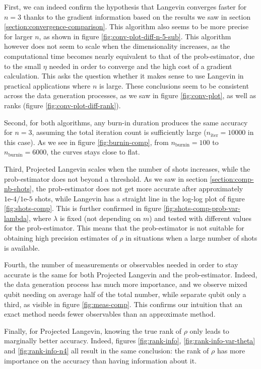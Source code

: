 \documentclass[12pt]{memoir}
\newcommand{\nitern}[1]{$n_{\text{iter}}=#1$}
\newcommand{\nburninn}[1]{$n_{\text{burnin}}=#1$}
\begin{document}
First, we can indeed confirm the hypothesis that Langevin converges faster for $n=3$ thanks to the gradient information based on the results we saw in section \ref{section:convergence-comparison}. This algorithm also seems to be more precise for larger $n$, as shown in figure \ref{fig:conv-plot-diff-n-5-sub}. This algorithm however does not seem to scale when the dimensionality increases, as the computational time becomes nearly equivalent to that of the prob-estimator, due to the small $\eta$ needed in order to converge and the high cost of a gradient calculation. This asks the question whether it makes sense to use Langevin in practical applications where $n$ is large. These conclusions seem to be consistent across the data generation processes, as we saw in figure \ref{fig:conv-plot}, as well as ranks (figure \ref{fig:conv-plot-diff-rank}).\medbreak

Second, for both algorithms, any burn-in duration produces the same accuracy for $n=3$, assuming the total iteration count is sufficiently large (\nitern{10000} in this case). As we see in figure \ref{fig:burnin-comp}, from \nburninn{100} to \nburninn{6000}, the curves stays close to flat.\medbreak

Third, Projected Langevin scales when the number of shots increases, while the prob-estimator does not beyond a threshold. As we saw in section \ref{section:comp-nb-shots}, the prob-estimator does not get more accurate after approximately $1\text{e-}4/1\text{e-}5$ shots, while Langevin has a straight line in the log-log plot of figure \ref{fig:shots-comp}. This is further confirmed in figure \ref{fig:shots-comp-prob-var-lambda}, where $\lambda$ is fixed (not depending on $m$) and tested with different values for the prob-estimator. This means that the prob-estimator is not suitable for obtaining high precision estimates of $\rho$ in situations when a large number of shots is available.\medbreak

Fourth, the number of measurements or observables needed in order to stay accurate is the same for both Projected Langevin and the prob-estimator. Indeed, the data generation process has much more importance, and we observe mixed qubit needing on average half of the total number, while separate qubit only a third, as visible in figure \ref{fig:meas-comp}. This confirms our intuition that an exact method needs fewer observables than an approximate method.\medbreak

Finally, for Projected Langevin, knowing the true rank of $\rho$ only leads to marginally better accuracy. Indeed, figures \ref{fig:rank-info}, \ref{fig:rank-info-var-theta} and \ref{fig:rank-info-n4} all result in the same conclusion: the rank of $\rho$ has more importance on the accuracy than having information about it.
\end{document}
